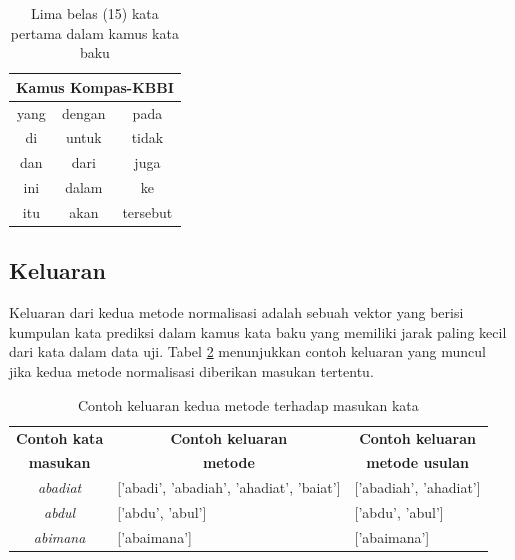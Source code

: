 \begin{table}[H]
    \captionsetup{justification=justified,singlelinecheck=false}
    \caption{Lima belas (15) kata pertama dalam kamus kata baku}
    \label{tbl:dictionary_kbbi-kompas}
    \centering
    \begin{tabular}{|c|c|c|}
        \hline
        \multicolumn{3}{|c|}{\textbf{Kamus Kompas-KBBI}} \\ \hline
        yang & dengan & pada \\
        di & untuk & tidak \\
        dan & dari & juga \\
        ini & dalam & ke \\
        itu & akan & tersebut \\ \hline
    \end{tabular}
\end{table}

\subsection{Keluaran}

Keluaran dari kedua metode normalisasi adalah sebuah vektor yang berisi kumpulan kata prediksi dalam kamus kata baku yang memiliki jarak paling kecil dari kata dalam data uji. Tabel \ref{tbl:output} menunjukkan contoh keluaran yang muncul jika kedua metode normalisasi diberikan masukan tertentu.
\begin{table}[ht]
    \captionsetup{justification=justified,singlelinecheck=false}
    \caption{Contoh keluaran kedua metode terhadap masukan kata}
    \label{tbl:output}
    \centering
    \begin{tabularx}{\textwidth}{|c|X|X|}
        \hline
        \textbf{Contoh kata} & \multicolumn{1}{c|}{\textbf{Contoh keluaran}} & \multicolumn{1}{c|}{\textbf{Contoh keluaran}} \\
        \textbf{masukan} & \multicolumn{1}{c|}{\textbf{metode \parencite{saragih2017normalisasi}}} & \multicolumn{1}{c|}{\textbf{metode usulan}} \\ \hline
        \textit{abadiat} & {[}'abadi', 'abadiah', 'ahadiat', 'baiat'] & {[}'abadiah', 'ahadiat'] \\ \hline
        \textit{abdul} & {[}'abdu', 'abul'] & {[}'abdu', 'abul'] \\ \hline
        \textit{abimana} & {[}'abaimana'] & {[}'abaimana'] \\ \hline
    \end{tabularx}
\end{table}

